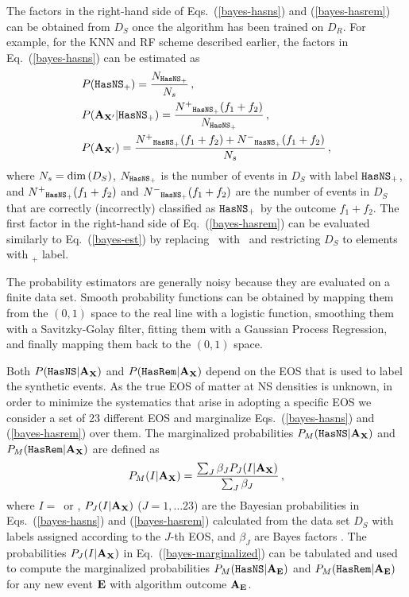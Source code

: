 The factors in the right-hand side of Eqs.~(\ref{bayes-hasns}) and (\ref{bayes-hasrem}) can be obtained from $D_{S}$ once the algorithm has been trained on $D_{R}$. For example, for the \ac{KNN} and \ac{RF} scheme described earlier, the factors in Eq.~(\ref{bayes-hasns}) can be estimated as  
%
\begin{align}
&P({{\tt HasNS}}_+)=\frac{N_{{{\tt HasNS}}_+}}{N_s}\,,\nonumber\\
&P({\bf A}_{{\bf X}'}|{{\tt HasNS}}_+)=\frac{N^+{}_{{{\tt HasNS}}_+}(f_1+f_2)}{N_{{{\tt HasNS}}_+}}\,,\nonumber\\
&P({\bf A}_{{\bf X}'})=\frac{N^+{}_{{{\tt HasNS}}_+}(f_1+f_2)+N^-{}_{{{\tt HasNS}}_+}(f_1+f_2)}{N_s}\,,\label{bayes-est}
\end{align}
%
where $N_s=\hbox{dim}\,(D_S)$, $N_{{{\tt HasNS}}_+}$ is the number of events in $D_S$ with label ${{\tt HasNS}}_+$, and $N^+{}_{{{\tt HasNS}}_+}(f_1+f_2)$ and $N^-{}_{{{\tt HasNS}}_+}(f_1+f_2)$ are the number of events in $D_S$ that are correctly (incorrectly) classified as ${{{\tt HasNS}}_+}$ by the outcome $f_1+f_2$. The first factor in the right-hand side of Eq.~(\ref{bayes-hasrem}) can be evaluated similarly to Eq.~(\ref{bayes-est}) by replacing \hasns\ with \hasrem\ and restricting $D_S$ to elements with \hasns$_+$ label.

The probability estimators are generally noisy because they are evaluated on a finite data set. Smooth probability functions can be obtained by mapping them from the $(0,1)$ space to the real
line with a logistic function, smoothing them with a Savitzky-Golay filter, fitting them with a Gaussian Process Regression, and finally mapping them back to the $(0,1)$ space.   

Both $P({{\tt HasNS}}|{\bf A}_{\bf X})$ and $P({{\tt HasRem}}|{\bf A}_{\bf X})$ depend on the \ac{EOS} that is used to label the synthetic events. 
 As the true \ac{EOS} of matter at \ac{NS} densities is unknown, in order to minimize the systematics that arise in adopting a specific \ac{EOS} we consider a set of 23 different \ac{EOS} and marginalize Eqs.~(\ref{bayes-hasns}) and (\ref{bayes-hasrem}) over them. The marginalized probabilities $P_M({{\tt HasNS}}|{\bf A}_{\bf X})$ and $P_M({{\tt HasRem}}|{\bf A}_{\bf X})$ are defined as
%
\begin{equation}
P_M(I|{\bf A}_{\bf X})=\frac{\sum_J\beta_J P_J(I|{\bf A}_{\bf X})}{\sum_J\beta_J}\,,\label{bayes-marginalized}
\end{equation}
%
where $I=$\hasns\ or \hasrem, $P_J(I|{\bf A}_{\bf X})$ ($J=1,\dots 23$) are the Bayesian probabilities in Eqs.~(\ref{bayes-hasns}) and (\ref{bayes-hasrem}) calculated from the data set $D_S$ with labels assigned according to the $J$-th \ac{EOS}, and $\beta_J$ are Bayes factors \citep{Ghosh:2021eqv}.   The probabilities $P_J(I|{\bf A}_{\bf X})$ in Eq.~(\ref{bayes-marginalized}) can be tabulated and used to compute the marginalized probabilities $P_M({{\tt HasNS}}|{\bf A}_{\bf E})$ and $P_M({{\tt HasRem}}|{\bf A}_{\bf E})$ for any new event $\bf E$ with algorithm outcome $\bf A_{E}$.
